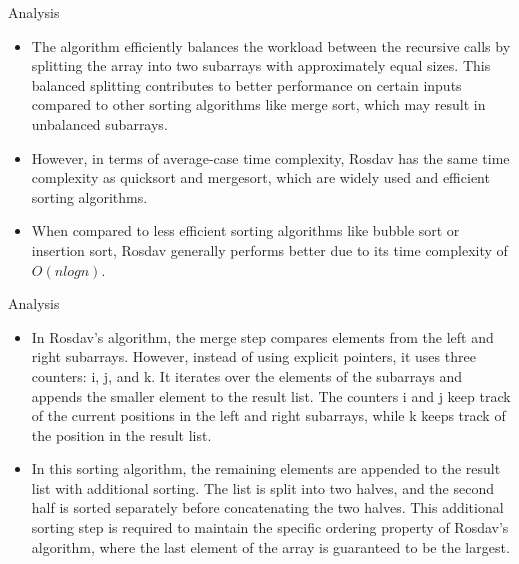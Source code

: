 \documentclass[10pt]{beamer}
\begin{document}
\begin{frame}{Analysis}
\begin{tcolorbox}[colback=blue!5,colframe=blue!40!black,title=Performance and Comparisons:]
\begin{itemize}

   \item The algorithm efficiently balances the workload between the recursive calls by splitting the array into two subarrays with approximately equal sizes. This balanced splitting contributes to better performance on certain inputs compared to other sorting algorithms like merge sort, which may result in unbalanced subarrays.
   
   \item However, in terms of average-case time complexity, Rosdav has the same time complexity as quicksort and mergesort, which are widely used and efficient sorting algorithms.
   
   \item When compared to less efficient sorting algorithms like bubble sort or insertion sort, Rosdav generally performs better due to its time complexity of $O(n log n)$.
   
\end{itemize}
\end{tcolorbox}
\end{frame}

\begin{frame}{Analysis}
\begin{tcolorbox}[colback=blue!5,colframe=blue!40!black,title=Performance and Comparisons:] 
\begin{itemize}

    \item In Rosdav's algorithm, the merge step compares elements from the left and right subarrays. However, instead of using explicit pointers, it uses three counters: i, j, and k. It iterates over the elements of the subarrays and appends the smaller element to the result list. The counters i and j keep track of the current positions in the left and right subarrays, while k keeps track of the position in the result list.
   
   \item In this sorting algorithm, the remaining elements are appended to the result list with additional sorting. The list is split into two halves, and the second half is sorted separately before concatenating the two halves. This additional sorting step is required to maintain the specific ordering property of Rosdav's algorithm, where the last element of the array is guaranteed to be the 
   largest.
   
\end{itemize}
\end{tcolorbox}
\end{frame}
\end{document}
